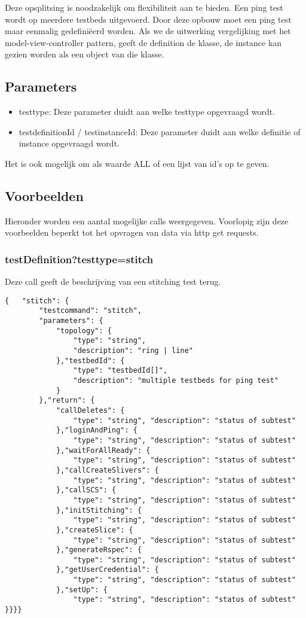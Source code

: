 Deze opsplitsing is noodzakelijk om flexibiliteit aan te bieden. 
Een ping test wordt op meerdere testbeds uitgevoerd. Door deze opbouw moet een ping test maar eenmalig gedefini\"eerd worden. Als we de uitwerking vergelijking met het model-view-controller pattern, geeft de definition de klasse, de instance kan gezien worden als een object van die klasse.

\subsection{Parameters}

\begin{itemize}
\item testtype: Deze parameter duidt aan welke testtype opgevraagd wordt.
\item testdefinitionId / testinstanceId: Deze parameter duidt aan welke definitie of instance opgevraagd wordt.
\end{itemize}
Het is ook mogelijk om als waarde ALL of een lijst van id's op te geven.

\subsection{Voorbeelden}
Hieronder worden een aantal mogelijke calls weergegeven. Voorlopig zijn deze voorbeelden beperkt tot het opvragen van data via http get requests.

\clearpage
\subsubsection{testDefinition?testtype=stitch}
Deze call geeft de beschrijving van een stitching test terug.
\begin{verbatim}
{   "stitch": {
        "testcommand": "stitch",
        "parameters": {
            "topology": {
                "type": "string",
                "description": "ring | line"
            },"testbedId": {
                "type": "testbedId[]",
                "description": "multiple testbeds for ping test"
            }
        },"return": {
            "callDeletes": {
                "type": "string", "description": "status of subtest"
            },"loginAndPing": {
                "type": "string", "description": "status of subtest"
            },"waitForAllReady": {
                "type": "string", "description": "status of subtest"
            },"callCreateSlivers": {
                "type": "string", "description": "status of subtest"
            },"callSCS": {
                "type": "string", "description": "status of subtest"
            },"initStitching": {
                "type": "string", "description": "status of subtest"
            },"createSlice": {
                "type": "string", "description": "status of subtest"
            },"generateRspec": {
                "type": "string", "description": "status of subtest"
            },"getUserCredential": {
                "type": "string", "description": "status of subtest"
            },"setUp": {
                "type": "string", "description": "status of subtest"
}}}}
\end{verbatim}
\clearpage
